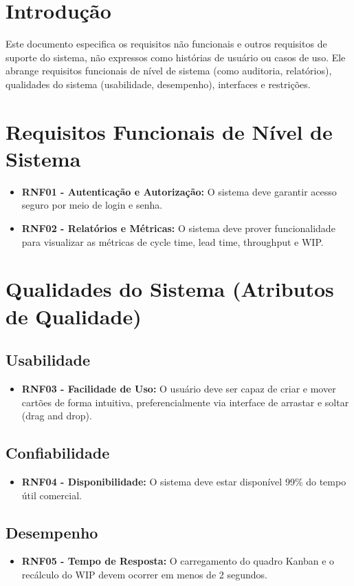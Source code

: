 \section{Introdução}
Este documento especifica os requisitos não funcionais e outros 
requisitos de suporte do sistema, não expressos como histórias 
de usuário ou casos de uso. Ele abrange requisitos funcionais 
de nível de sistema (como auditoria, relatórios), qualidades 
do sistema (usabilidade, desempenho), interfaces e restrições.

\section{Requisitos Funcionais de Nível de Sistema}
\begin{itemize}
    \item \textbf{RNF01 - Autenticação e Autorização:} O sistema deve 
    garantir acesso seguro por meio de login e senha.
    \item \textbf{RNF02 - Relatórios e Métricas:} O sistema deve prover 
    funcionalidade para visualizar as métricas de cycle time, lead time, 
    throughput e WIP.
\end{itemize}

\section{Qualidades do Sistema (Atributos de Qualidade)}
\subsection{Usabilidade}
\begin{itemize}
    \item \textbf{RNF03 - Facilidade de Uso:} O usuário deve ser capaz 
    de criar e mover cartões de forma intuitiva, preferencialmente via 
    interface de arrastar e soltar (drag and drop).
\end{itemize}

\subsection{Confiabilidade}
\begin{itemize}
    \item \textbf{RNF04 - Disponibilidade:} O sistema deve estar disponível 
    99\% do tempo útil comercial.
\end{itemize}

\subsection{Desempenho}
\begin{itemize}
    \item \textbf{RNF05 - Tempo de Resposta:} O carregamento do quadro 
    Kanban e o recálculo do WIP devem ocorrer em menos de 2 segundos.
\end{itemize}

